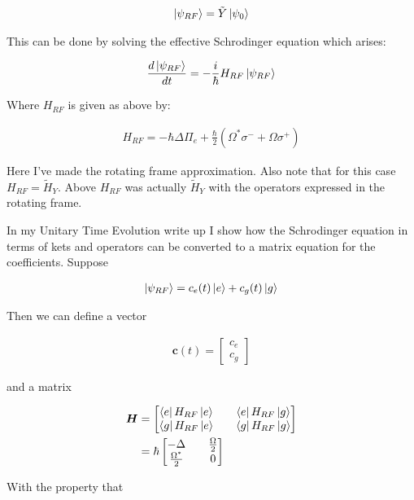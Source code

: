 \documentclass[12pt]{article}
\newcommand{\ddt}[1]{\frac{d #1}{dt}}
\newcommand{\bv}[1]{\boldsymbol{#1}}
\begin{document}
\begin{align}
\ket{\psi_{RF}} = \tilde{Y}\ket{\psi_0}
\end{align}

This can be done by solving the effective Schrodinger equation which arises:

\begin{align}
\ddt{\ket{\psi_{RF}}} = -\frac{i}{\hbar} H_{RF} \ket{\psi_{RF}}
\end{align}

Where $H_{RF}$ is given as above by:

\begin{align}
H_{RF} = -\hbar \Delta \Pi_e + \frac{\hbar}{2}\left(\Omega^*\sigma^- + \Omega \sigma^+ \right)
\end{align}

Here I've made the rotating frame approximation. Also note that for this case $H_{RF} = \tilde{H}_Y$. Above $H_{RF}$ was actually $\tilde{H}_Y$ with the operators expressed in the rotating frame.

In my Unitary Time Evolution write up I show how the Schrodinger equation in terms of kets and operators can be converted to a matrix equation for the coefficients. Suppose

\begin{align}
\ket{\psi_{RF}} = c_e(t) \ket{e} + c_g(t) \ket{g}
\end{align}

Then we can define a vector

\begin{align}
\bv{c}(t) = \begin{bmatrix}c_e\\c_g\end{bmatrix}
\end{align}

and a matrix

\begin{align}
\bv{H} &= 
\begin{bmatrix}
\bra{e}H_{RF}\ket{e} && \bra{e}H_{RF}\ket{g}\\
\bra{g}H_{RF}\ket{e} && \bra{g}H_{RF}\ket{g}
\end{bmatrix}\\
&=
\hbar\begin{bmatrix}
-\Delta&& \frac{\Omega}{2}\\
\frac{\Omega^*}{2}&& 0
\end{bmatrix}
\end{align}

With the property that
\end{document}
